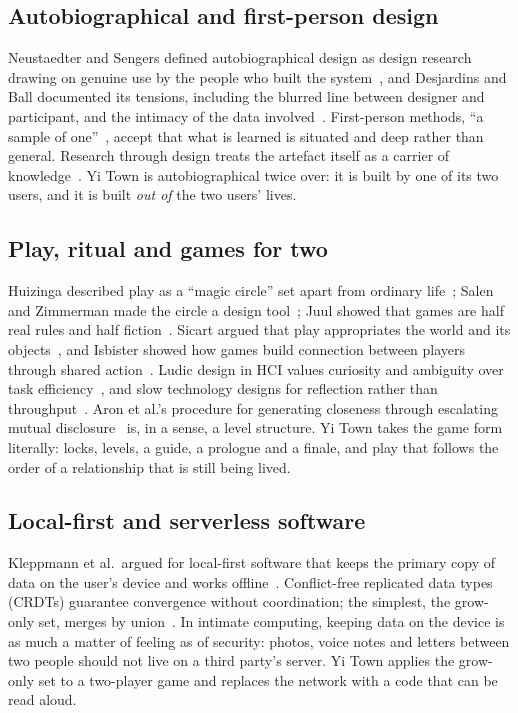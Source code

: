 \documentclass[sigconf,nonacm]{acmart}
\newcommand{\yt}{Yi Town}
\begin{document}
\subsection{Autobiographical and first-person design}
Neustaedter and Sengers defined autobiographical design as design research drawing on genuine
use by the people who built the system~\cite{neustaedter2012autobiographical}, and Desjardins
and Ball documented its tensions, including the blurred line between designer and
participant, and the intimacy of the data involved~\cite{desjardins2018tensions}. First-person
methods, ``a sample of one''~\cite{lucero2019sample}, accept that what is learned is situated and
deep rather than general. Research through design treats the artefact itself as a carrier of
knowledge~\cite{zimmerman2007rtd,gaver2012expect}. \yt{} is autobiographical twice over: it is built
by one of its two users, and it is built \emph{out of} the two users' lives.

\subsection{Play, ritual and games for two}
Huizinga described play as a ``magic circle'' set apart from ordinary life~\cite{huizinga1955homo};
Salen and Zimmerman made the circle a design tool~\cite{salen2004rules}; Juul showed that games
are half real rules and half fiction~\cite{juul2005halfreal}. Sicart argued that play
appropriates the world and its objects~\cite{sicart2014play}, and Isbister showed how games build
connection between players through shared action~\cite{isbister2016games}. Ludic design in HCI
values curiosity and ambiguity over task efficiency~\cite{gaver2004drift,gaver2003ambiguity}, and
slow technology designs for reflection rather than throughput~\cite{hallnas2001slow,odom2012technology}.
Aron et al.'s procedure for generating closeness through escalating mutual
disclosure~\cite{aron1997closeness} is, in a sense, a level structure. \yt{} takes the game form
literally: locks, levels, a guide, a prologue and a finale, and play that follows the order of
a relationship that is still being lived.

\subsection{Local-first and serverless software}
Kleppmann et al.\ argued for local-first software that keeps the primary copy of data on the
user's device and works offline~\cite{kleppmann2019localfirst}. Conflict-free replicated data types
(CRDTs) guarantee convergence without coordination; the simplest, the grow-only set, merges by
union~\cite{shapiro2011crdt}. In intimate computing, keeping data on the device is as much a
matter of feeling as of security: photos, voice notes and letters between two people should not
live on a third party's server. \yt{} applies the grow-only set to a two-player game and replaces
the network with a code that can be read aloud.
\end{document}
